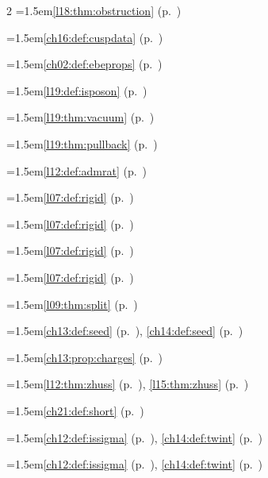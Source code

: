 \begin{multicols}{2}
\hangindent=1.5em\quad \ref{l18:thm:obstruction} (p.~\pageref{l18:thm:obstruction})\par
\hangindent=1.5em\quad \ref{ch16:def:cuspdata} (p.~\pageref{ch16:def:cuspdata})\par
\hangindent=1.5em\quad \ref{ch02:def:ebeprops} (p.~\pageref{ch02:def:ebeprops})\par
\hangindent=1.5em\quad \ref{l19:def:isposon} (p.~\pageref{l19:def:isposon})\par
\hangindent=1.5em\quad \ref{l19:thm:vacuum} (p.~\pageref{l19:thm:vacuum})\par
\hangindent=1.5em\quad \ref{l19:thm:pullback} (p.~\pageref{l19:thm:pullback})\par
\hangindent=1.5em\quad \ref{l12:def:admrat} (p.~\pageref{l12:def:admrat})\par
\hangindent=1.5em\quad \ref{l07:def:rigid} (p.~\pageref{l07:def:rigid})\par
\hangindent=1.5em\quad \ref{l07:def:rigid} (p.~\pageref{l07:def:rigid})\par
\hangindent=1.5em\quad \ref{l07:def:rigid} (p.~\pageref{l07:def:rigid})\par
\hangindent=1.5em\quad \ref{l07:def:rigid} (p.~\pageref{l07:def:rigid})\par
\hangindent=1.5em\quad \ref{l09:thm:split} (p.~\pageref{l09:thm:split})\par
\hangindent=1.5em\quad \ref{ch13:def:seed} (p.~\pageref{ch13:def:seed}), \ref{ch14:def:seed} (p.~\pageref{ch14:def:seed})\par
\hangindent=1.5em\quad \ref{ch13:prop:charges} (p.~\pageref{ch13:prop:charges})\par
\hangindent=1.5em\quad \ref{l12:thm:zhuss} (p.~\pageref{l12:thm:zhuss}), \ref{l15:thm:zhuss} (p.~\pageref{l15:thm:zhuss})\par
\hangindent=1.5em\quad \ref{ch21:def:short} (p.~\pageref{ch21:def:short})\par
\hangindent=1.5em\quad \ref{ch12:def:issigma} (p.~\pageref{ch12:def:issigma}), \ref{ch14:def:twint} (p.~\pageref{ch14:def:twint})\par
\hangindent=1.5em\quad \ref{ch12:def:issigma} (p.~\pageref{ch12:def:issigma}), \ref{ch14:def:twint} (p.~\pageref{ch14:def:twint})\par

\end{multicols}
